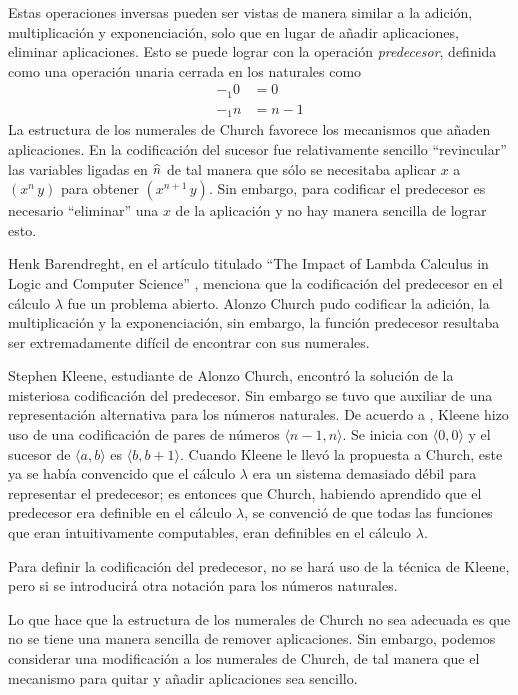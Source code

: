 Estas operaciones inversas pueden ser vistas de manera similar a la adición, multiplicación y exponenciación, solo que en lugar de añadir aplicaciones, eliminar aplicaciones. Esto se puede lograr con la operación \emph{predecesor}, definida como una operación unaria cerrada en los naturales como
\begin{align*}
  -_{1} 0 &= 0 \\
  -_{1} n &= n-1
\end{align*}
La estructura de los numerales de Church favorece los mecanismos que añaden aplicaciones. En la codificación del sucesor fue relativamente sencillo ``revincular'' las variables ligadas en $ \widehat{n} $ de tal manera que sólo se necesitaba aplicar $ x $ a $ (x^{n}\, y) $ para obtener $ (x^{n+1}\, y) $. Sin embargo, para codificar el predecesor es necesario ``eliminar'' una $ x $ de la aplicación y no hay manera sencilla de lograr esto.

Henk Barendreght, en el artículo titulado ``The Impact of Lambda Calculus in Logic and Computer Science'' \cite{Barendregt:Impact}, menciona que la codificación del predecesor en el cálculo $ λ $ fue un problema abierto. Alonzo Church pudo codificar la adición, la multiplicación y la exponenciación, sin embargo, la función predecesor resultaba ser extremadamente difícil de encontrar con sus numerales.

Stephen Kleene, estudiante de Alonzo Church, encontró la solución de la misteriosa codificación del predecesor. Sin embargo se tuvo que auxiliar de una representación alternativa para los números naturales. De acuerdo a \cite{Barendregt:Impact}, Kleene hizo uso de una codificación de pares de números $ \langle n-1,n \rangle $. Se inicia con $ \langle 0,0 \rangle $ y el sucesor de $ \langle a,b \rangle $ es $ \langle b,b+1 \rangle $. Cuando Kleene le llevó la propuesta a Church, este ya se había convencido que el cálculo $ λ $ era un sistema demasiado débil para representar el predecesor; es entonces que Church, habiendo aprendido que el predecesor era definible en el cálculo $ λ $, se convenció de que todas las funciones que eran intuitivamente computables, eran definibles en el cálculo $ λ $.

Para definir la codificación del predecesor, no se hará uso de la técnica de Kleene, pero si se introducirá otra notación para los números naturales.

Lo que hace que la estructura de los numerales de Church no sea adecuada es que no se tiene una manera sencilla de remover aplicaciones. Sin embargo, podemos considerar una modificación a los numerales de Church, de tal manera que el mecanismo para quitar y añadir aplicaciones sea sencillo.

